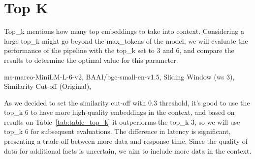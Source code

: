 \section{Top K}\label{sec:top-k}
Top\_k mentions how many top embeddings to take into context.
Considering a large top\_k might go beyond the max\_tokens of the model, we will evaluate the performance of the pipeline with the top\_k set to 3 and 6, and compare the results to determine the optimal value for this parameter.
\begin{table}[h!]
    \centering
    \noindent
    \caption{Performance evaluation of different Top\_k retrieval strategies on the FactBench dataset using the Gemma2 model. }
    {\scriptsize ms-marco-MiniLM-L-6-v2, BAAI/bge-small-en-v1.5, Sliding Window (ws 3), Similarity Cut-off (Original),}
    \label{tab:table_top_k}
\end{table}
\newline
As we decided to set the similarity cut-off with 0.3 threshold, it's good to use the top\_k 6 to have more high-quality embeddings in the context, and based on results on Table~\ref{tab:table_top_k} it outperforms the top\_k 3, so we will use top\_k 6 for subsequent evaluations.
The difference in latency is significant, presenting a trade-off between more data and response time.
Since the quality of data for additional facts is uncertain, we aim to include more data in the context.


